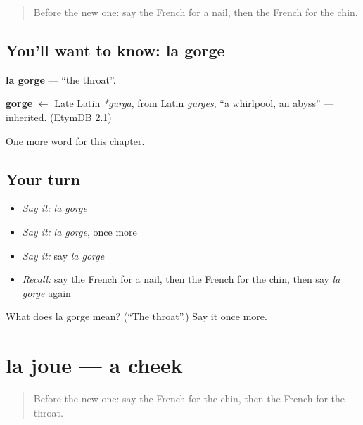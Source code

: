 \label{lesson:FR-C51-gorge}



\begin{quote}
Before the new one: say the French for a nail, then the French for the chin.
\end{quote}

\subsection*{You'll want to know: la gorge}
\textbf{la gorge} — \textquotedblleft{}the throat\textquotedblright{}.

\begin{cousinweb}
\textbf{gorge} $\leftarrow$ Late Latin \emph{*gurga}, from Latin \emph{gurges}, \textquotedblleft{}a whirlpool, an abyss\textquotedblright{} — inherited. (EtymDB 2.1)
\end{cousinweb}

\begin{grammarlens}[title={What you've built}]
One more word for this chapter.
\end{grammarlens}

\subsection*{Your turn}
\begin{itemize}
\raggedright
  \item \emph{Say it:} \emph{la gorge}
  \item \emph{Say it:} \emph{la gorge}, once more
  \item \emph{Say it:} say \emph{la gorge}
  \item \emph{Recall:} say the French for a nail, then the French for the chin, then say \emph{la gorge} again
\end{itemize}

\begin{tcolorbox}[breakable,colback=teal!4,colframe=teal!35!black,title={Before you move on}]
What does la gorge mean? (\textquotedblleft{}The throat\textquotedblright{}.) Say it once more.
\end{tcolorbox}
\section[la joue]{la joue — a cheek}

\label{lesson:FR-C51-joue}



\begin{quote}
Before the new one: say the French for the chin, then the French for the throat.
\end{quote}

